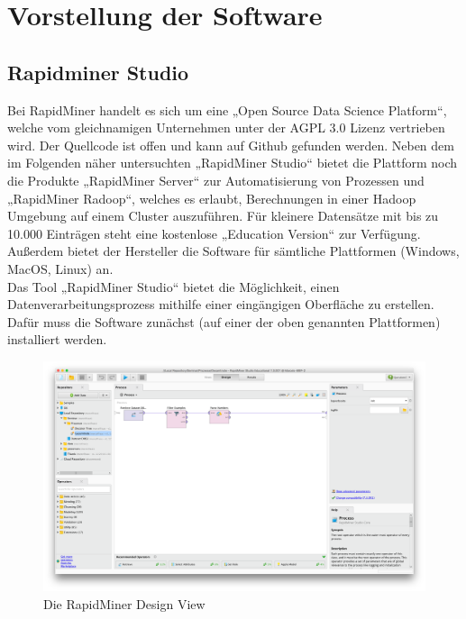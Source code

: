 %


%
%
\chapter{Vorstellung der Software}
\label{sec:software}

\section{Rapidminer Studio}
\label{sec:software:rm}

Bei RapidMiner handelt es sich um eine „Open Source Data Science Platform“,
welche vom gleichnamigen Unternehmen unter der AGPL 3.0 Lizenz vertrieben wird.
Der Quellcode ist offen und kann auf Github gefunden werden. Neben dem im
Folgenden näher untersuchten „RapidMiner Studio“ bietet die Plattform noch die
Produkte „RapidMiner Server“ zur Automatisierung von Prozessen und „RapidMiner
Radoop“, welches es erlaubt, Berechnungen in einer Hadoop Umgebung auf einem
Cluster auszuführen. Für kleinere Datensätze mit bis zu 10.000 Einträgen steht
eine kostenlose „Education Version“ zur Verfügung. Außerdem bietet der
Hersteller die Software für sämtliche Plattformen (Windows, MacOS, Linux) an. \\
Das Tool „RapidMiner Studio“ bietet die Möglichkeit, einen
Datenverarbeitungsprozess mithilfe einer eingängigen Oberfläche zu erstellen.
Dafür muss die Software zunächst (auf einer der oben genannten Plattformen)
installiert werden.

\begin{figure}[htb]
	\includegraphics[width=\textwidth]{gfx/rm1.png}
	\caption{Die RapidMiner Design View}
	\label{fig:software:rm:des}
\end{figure}

